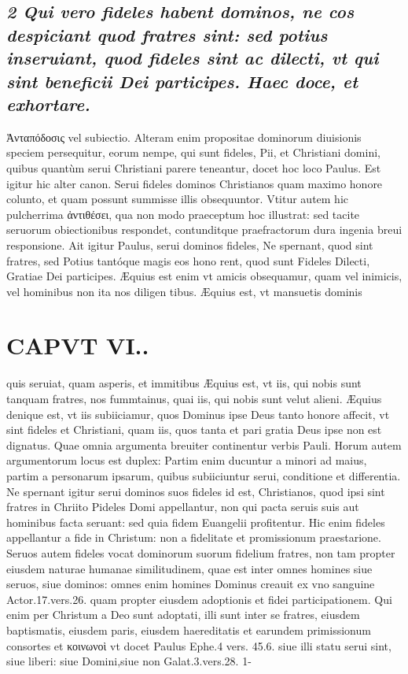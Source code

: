 \documentclass{article}
\begin{document}
\begin{pages}
\subsection*{\textit{2 Qui vero fideles habent dominos, ne cos despiciant quod fratres sint: sed potius inseruiant, quod fideles sint ac dilecti, vt qui sint beneficii Dei participes. Haec doce, et exhortare. }}\pstart Ἀνταπόδοσις vel subiectio. Alteram enim propositae dominorum diuisionis speciem persequitur, eorum nempe, qui sunt fideles, Pii, et Christiani domini, quibus quantùm serui Christiani parere teneantur, docet hoc loco Paulus. Est igitur hic alter canon. Serui fideles dominos Christianos quam maximo honore colunto, et quam possunt summisse illis obsequuntor. Vtitur autem hic pulcherrima ἀντιθέσει, qua non modo praeceptum hoc illustrat: sed tacite seruorum obiectionibus respondet, contunditque praefractorum dura ingenia breui responsione. Ait igitur Paulus, serui dominos fideles, Ne spernant, quod sint fratres, sed Potius tantóque magis eos hono rent, quod sunt Fideles Dilecti, Gratiae Dei participes. Æquius est enim vt amicis obsequamur, quam vel inimicis, vel hominibus non ita nos diligen tibus. Æquius est, vt mansuetis dominis  \pend
\section*{CAPVT  VI.. }
\marginpar{[ p.419 ]}\pstart quis seruiat, quam asperis, et immitibus  \pend\pstart Æquius est, vt iis, qui nobis sunt tanquam fratres, nos fummtainus, quai iis, qui nobis sunt velut alieni.  \pend\pstart Æquius denique est, vt iis subiiciamur, quos Dominus ipse Deus tanto honore affecit, vt sint fideles et Christiani, quam iis, quos tanta et pari gratia Deus ipse non est dignatus. Quae omnia argumenta breuiter continentur verbis Pauli. Horum autem argumentorum locus est duplex: Partim enim ducuntur a minori ad maius, partim a personarum ipsarum, quibus subiiciuntur serui, conditione et differentia.  \pend\pstart Ne spernant igitur serui dominos suos fideles id est, Christianos, quod ipsi sint fratres in Chriito Pideles Domi appellantur, non qui pacta seruis suis aut hominibus facta seruant: sed quia fidem Euangelii profitentur. Hic enim fideles appellantur a fide in Christum: non a fidelitate et promissionum praestarione.  \pend\pstart Seruos autem fideles vocat dominorum suorum fidelium fratres, non tam propter eiusdem naturae humanae similitudinem, quae est inter omnes homines siue seruos, siue dominos: omnes enim homines Dominus creauit ex vno sanguine Actor.17.vers.26. quam propter eiusdem adoptionis et fidei participationem. Qui enim per Christum a Deo sunt adoptati, illi sunt inter se fratres, eiusdem baptismatis, eiusdem paris, eiusdem haereditatis et earundem primissionum consortes et κοινωνοὶ vt docet Paulus Ephe.4 vers. 45.6. siue illi statu serui sint, siue liberi: siue Domini,siue non Galat.3.vers.28. 1-  \pend

\end{pages}
\end{document}
